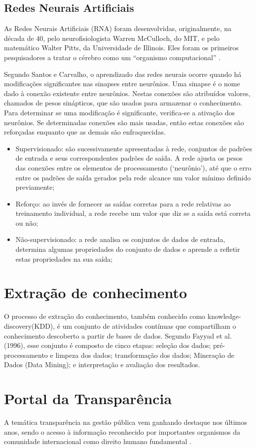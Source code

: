 \subsection{Redes Neurais Artificiais}
As Redes Neurais Artificiais (RNA) foram desenvolvidas, originalmente, na década de 40, pelo neurofisiologista Warren McCulloch, do MIT, e pelo matemático Walter Pitts, da Universidade de Illinois. Eles foram os primeiros pesquisadores a tratar o cérebro como um “organismo computacional” \cite{medeiros1999}.  

Segundo Santos e Carvalho, o aprendizado das redes neurais ocorre quando há modificações significantes nas sinapses entre neurônios. Uma sinapse é o nome dado à conexão existente entre neurônios. Nestas conexões são atribuídos valores, chamados de pesos sinápticos, que são usados para armazenar o conhecimento. Para determinar se uma modificação é significante, verifica-se a ativação dos neurônios. Se determinadas conexões são mais usadas, então estas conexões são reforçadas enquanto que as demais são enfraquecidas.  

\begin{itemize}
	\item Supervisionado: são sucessivamente apresentadas à rede, conjuntos de padrões de entrada e seus correspondentes padrões de saída. A rede ajusta os pesos das conexões entre os elementos de processamento (‘neurônio’), até que o erro entre os padrões de saída gerados pela rede alcance um valor mínimo definido previamente;
	
	\item Reforço: ao invés de fornecer as saídas corretas para a rede relativas ao treinamento individual, a rede recebe um valor que diz se a saída está correta ou não;
	
	\item Não-supervisionado: a rede analisa os conjuntos de dados de entrada, determina algumas propriedades do conjunto de dados e aprende a refletir estas propriedades na sua saída; 
\end{itemize}

\section{Extração de conhecimento}
O processo de extração do conhecimento, também conhecido como knowledge-discovery(KDD), é um conjunto de atividades contínuas que compartilham o conhecimento descoberto a partir de bases de dados. Segundo Fayyad et al. (1996), esse conjunto é composto de cinco etapas: seleção dos dados; pré-processamento e limpeza dos dados; transformação dos dados; Mineração de Dados (Data Mining); e interpretação e avaliação dos resultados. 

\section{Portal da Transparência}

A temática transparência na gestão pública vem ganhando destaque nos últimos anos, sendo o acesso à informação reconhecido por importantes organismos da comunidade internacional como direito humano fundamental \cite{guiaTransparencia2013}. 